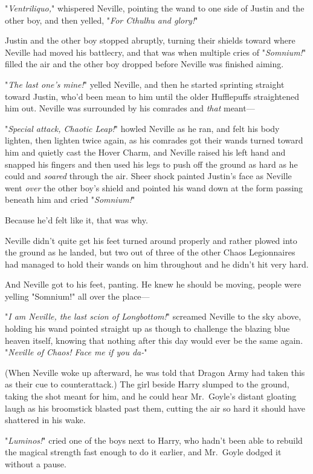 "\emph{Ventriliquo,}" whispered Neville, pointing the wand to one side of 
Justin and the other boy, and then yelled, "\emph{For Cthulhu and glory!}"

Justin and the other boy stopped abruptly, turning their shields toward where 
Neville had moved his battlecry, and that was when multiple cries of 
"\emph{Somnium!}" filled the air and the other boy dropped before Neville was 
finished aiming.

"\emph{The last one's mine!}" yelled Neville, and then he started sprinting 
straight toward Justin, who'd been mean to him until the older Hufflepuffs 
straightened him out. Neville was surrounded by his comrades and \emph{that} 
meant---

"\emph{Special attack, Chaotic Leap!}" howled Neville as he ran, and felt his 
body lighten, then lighten twice again, as his comrades got their wands turned 
toward him and quietly cast the Hover Charm, and Neville raised his left hand 
and snapped his fingers and then used his legs to push off the ground as hard 
as he could and \emph{soared} through the air. Sheer shock painted Justin's 
face as Neville went \emph{over} the other boy's shield and pointed his wand 
down at the form passing beneath him and cried "\emph{Somnium!}"

Because he'd felt like it, that was why.

Neville didn't quite get his feet turned around properly and rather plowed into 
the ground as he landed, but two out of three of the other Chaos Legionnaires 
had managed to hold their wands on him throughout and he didn't hit very hard.

And Neville got to his feet, panting. He knew he should be moving, people were 
yelling "Somnium!" all over the place---

"\emph{I am Neville, the last scion of Longbottom!}" screamed Neville to the 
sky above, holding his wand pointed straight up as though to challenge the 
blazing blue heaven itself, knowing that nothing after this day would ever be 
the same again. "\emph{Neville of Chaos! Face me if you da-}"

(When Neville woke up afterward, he was told that Dragon Army had taken this as 
their cue to counterattack.)
\sbreak
The girl beside Harry slumped to the ground, taking the shot meant for him, and 
he could hear Mr.~Goyle's distant gloating laugh as his broomstick blasted past 
them, cutting the air so hard it should have shattered in his wake.

"\emph{Luminos!}" cried one of the boys next to Harry, who hadn't been able to 
rebuild the magical strength fast enough to do it earlier, and Mr.~Goyle dodged 
it without a pause.

